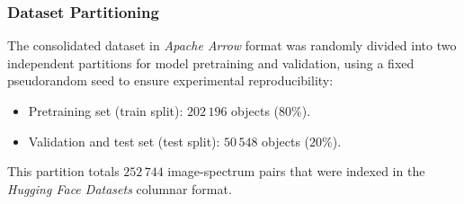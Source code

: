 \subsubsection{Dataset Partitioning}

The consolidated dataset in \textit{Apache Arrow} format was randomly divided into two independent partitions for model pretraining and validation, using a fixed pseudorandom seed to ensure experimental reproducibility:

\begin{itemize}
	\item Pretraining set (train split): $202\,196$ objects ($80\%$).
	\item Validation and test set (test split): $50\,548$ objects ($20\%$).
\end{itemize}

This partition totals $252\,744$ image-spectrum pairs that were indexed in the \textit{Hugging Face Datasets} columnar format.